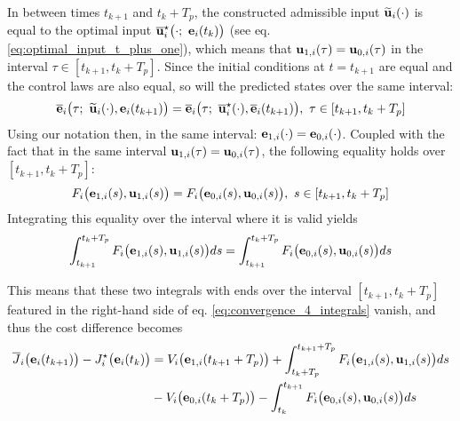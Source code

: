 \begin{gg_box}
In between times $t_{k+1}$ and $t_k + T_p$, the constructed admissible input
$\widetilde{\bm{\mathbf{u}}}_i(\cdot)$ is equal to the optimal
input $\overline{\vect{u}}_i^{\star}\big(\cdot;\ \vect{e}_i(t_k)\big)$
(see eq. \ref{eq:optimal_input_t_plus_one}), which means that
$\bm{\mathbf{u}}_{1,i}(\tau) = \bm{\mathbf{u}}_{0,i}(\tau)$ in the interval $\tau \in [t_{k+1}, t_k + T_p]$.
Since the initial conditions at $t=t_{k+1}$ are equal and the control laws
are also equal, so will the predicted states over the same interval:
\begin{align}
  \overline{\bm{\mathbf{e}}}_i\big(\tau;\ \widetilde{\bm{\mathbf{u}}}_i(\cdot), \bm{\mathbf{e}}_i(t_{k+1})\big) =
  \overline{\bm{\mathbf{e}}}_i\big(\tau;\ \overline{\bm{\mathbf{u}}}_i^{\star}(\cdot), \overline{\bm{\mathbf{e}}}_i(t_{k+1})\big), \ \tau \in [t_{k+1}, t_k + T_p]
  \label{eq:equal_predicted_without_disturbance}
\end{align}
Using our notation then, in the same interval:
$\bm{\mathbf{e}}_{1,i}(\cdot) = \bm{\mathbf{e}}_{0,i}(\cdot)$. Coupled with the fact that
in the same interval $\bm{\mathbf{u}}_{1,i}(\tau) = \bm{\mathbf{u}}_{0,i}(\tau)$, the following
equality holds over $[t_{k+1}, t_k + T_p]$:
\begin{align}
  F_i \big(\bm{\mathbf{e}}_{1,i}(s), \bm{\mathbf{u}}_{1,i} (s)\big) =
  F_i \big(\bm{\mathbf{e}}_{0,i}(s), \bm{\mathbf{u}}_{0,i} (s)\big),\ s \in [t_{k+1}, t_k + T_p]
\end{align}
Integrating this equality over the interval where it is valid yields
\begin{align}
  \int_{t_{k+1}}^{t_k + T_p}F_i \big(\bm{\mathbf{e}}_{1,i}(s), \bm{\mathbf{u}}_{1,i} (s)\big) ds =
  \int_{t_{k+1}}^{t_k + T_p}F_i \big(\bm{\mathbf{e}}_{0,i}(s), \bm{\mathbf{u}}_{0,i} (s)\big) ds
\end{align}
\end{gg_box}
This means that these two integrals with ends over the interval
$[t_{k+1}, t_k + T_p]$ featured in the right-hand side of eq.
\eqref{eq:convergence_4_integrals} vanish, and thus the cost difference becomes
\begin{align}
  \overline{J}_i\big(\bm{\mathbf{e}}_i(t_{k+1})\big) - J_i^{\star}\big(\bm{\mathbf{e}}_i(t_k)\big) &=
    V_i \big(\bm{\mathbf{e}}_{1,i} (t_{k+1} + T_p)\big)
    +\int_{t_k + T_p}^{t_{k+1} + T_p} F_i \big(\bm{\mathbf{e}}_{1,i}(s), \bm{\mathbf{u}}_{1,i} (s)\big) d s \\
    &-V_i \big(\bm{\mathbf{e}}_{0,i} (t_k + T_p)\big)
    -\int_{t_k}^{t_{k+1}} F_i \big(\bm{\mathbf{e}}_{0,i}(s), \bm{\mathbf{u}}_{0,i} (s)\big) d s
\label{eq:convergence_2_integrals}
\end{align}

